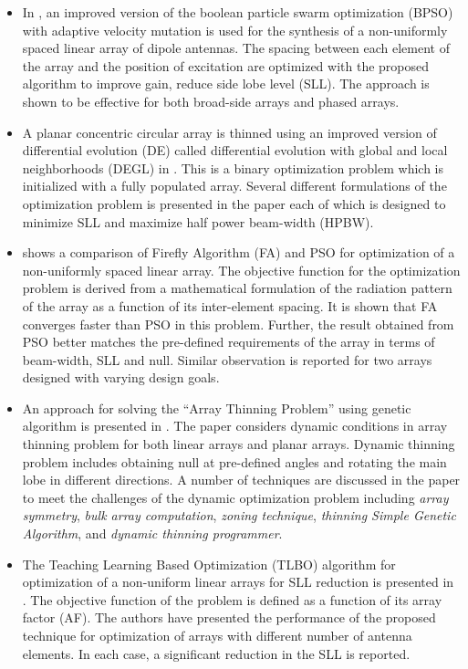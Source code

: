 \begin{itemize}
\item In \cite{arraySynth1}, an improved version of the boolean particle swarm optimization (BPSO) with adaptive velocity mutation is used for the synthesis of a non-uniformly spaced linear array of dipole antennas. The spacing between each element of the array and the position of excitation are optimized with the proposed algorithm to improve gain, reduce side lobe level (SLL). The approach is shown to be effective for both broad-side arrays and phased arrays.
\item A planar concentric circular array is thinned using an improved version of differential evolution (DE) called differential evolution with global and local neighborhoods (DEGL) in \cite{arrayThin1}. This is a binary optimization problem which is initialized with a fully populated array. Several different formulations of the optimization problem is presented in the paper each of which is designed to minimize SLL and maximize half power beam-width (HPBW).
\item \cite{nunUniformLinear} shows a comparison of Firefly Algorithm (FA) and PSO for optimization of a non-uniformly spaced linear array. The objective function for the optimization problem is derived from a mathematical formulation of the radiation pattern of the array as a function of its inter-element spacing. It is shown that FA converges faster than PSO in this problem. Further, the result obtained from PSO better matches the pre-defined requirements of the array in terms of beam-width, SLL and null. Similar observation is reported for two arrays designed with varying design goals.
\item An approach for solving the ``Array Thinning Problem'' using genetic algorithm is presented in \cite{thinningGA}. The paper considers dynamic conditions in array thinning problem for both linear arrays and planar arrays. Dynamic thinning problem includes obtaining null at pre-defined angles and rotating the main lobe in different directions. A number of techniques are discussed in the paper to meet the challenges of the dynamic optimization problem including \emph{array symmetry}, \emph{bulk array computation}, \emph{zoning technique}, \emph{thinning Simple Genetic Algorithm}, and \emph{dynamic thinning programmer}.
\item The Teaching Learning Based Optimization (TLBO) algorithm for optimization of a non-uniform linear arrays for SLL reduction is presented in \cite{arraySynth3}. The objective function of the problem is defined as a function of its array factor (AF). The authors have presented the performance of the proposed technique for optimization of arrays with different number of antenna elements. In each case, a significant reduction in the SLL is reported.

\end{itemize}
